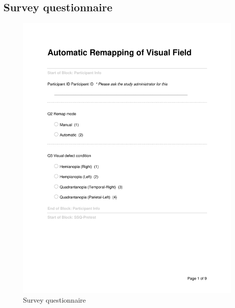 \documentclass{l4proj}
\begin{document}
\begin{appendices}
\subsection{Survey questionnaire}
\begin{figure}[htbp]
    \includegraphics[page=1,width=1\linewidth]{appendix/Automatic_Remapping_of_Visual_Field_Survey.pdf}   
    \caption{Survey questionnaire}
\end{figure}
\newpage
\begin{figure}[htbp]

\end{figure}
\end{appendices}
\end{document}
